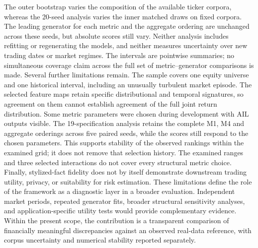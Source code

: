 {The outer bootstrap varies the composition of the available ticker
corpora, whereas the 20-seed analysis varies the inner matched draws
on fixed corpora.
The leading generator for each metric and the aggregate ordering
are unchanged across these seeds, but absolute scores still vary.
Neither analysis includes refitting or regenerating the models,
and neither measures uncertainty over new trading dates or market
regimes.
The intervals are pointwise summaries; no simultaneous coverage
claim across the full set of metric--generator comparisons is made.
Several further limitations remain.
The sample covers one equity universe and one historical interval,
including an unusually turbulent market episode.
The selected feature maps retain specific distributional and temporal
signatures, so agreement on them cannot establish agreement of the
full joint return distribution.
Some metric parameters were chosen during development with AIL
outputs visible. The 19-specification analysis retains the complete M1,
M4 and aggregate orderings across five paired seeds, while the scores
still respond to the chosen parameters. This supports stability of the
observed rankings within the examined grid; it does not remove that
selection history. The examined ranges and three
selected interactions do not cover every structural metric choice.
Finally, stylized-fact fidelity does not by itself demonstrate
downstream trading utility, privacy, or suitability for risk estimation.
These limitations define the role of the framework as a diagnostic
layer in a broader evaluation.
Independent market periods, repeated generator fits, broader structural
sensitivity analyses, and application-specific utility tests would provide
complementary evidence.
Within the present scope, the contribution is a transparent comparison
of financially meaningful discrepancies against an observed real-data
reference, with corpus uncertainty and numerical stability reported
separately.
}
